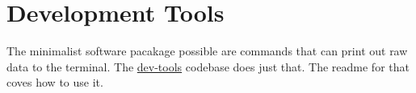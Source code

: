 \section{Development Tools}
The minimalist software pacakage possible are commands that can print out raw data to the terminal. The \href{https://github.com/muonTelescope/dev-tools}{dev-tools} codebase does just that. The readme for that coves how to use it.